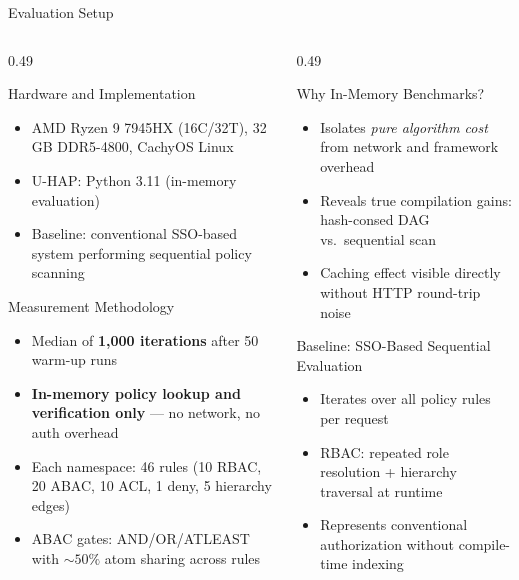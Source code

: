\documentclass[aspectratio=169,10pt]{beamer}
\newcommand{\tightitems}{%
  \setlength{\topsep}{1pt}%
  \setlength{\itemsep}{2pt}%
  \setlength{\parsep}{0pt}%
  \setlength{\parskip}{0pt}%
}
\begin{document}
\begin{frame}[t]{Evaluation Setup}
\vspace{3pt}
\begin{columns}[T,onlytextwidth]
\begin{column}{0.49\textwidth}
\begin{callout}{Hardware and Implementation}
\begin{itemize}\tightitems
\item AMD Ryzen 9 7945HX (16C/32T), 32\,GB DDR5-4800, CachyOS Linux
\item U-HAP: Python 3.11 (in-memory evaluation)
\item Baseline: conventional SSO-based system performing sequential policy scanning
\end{itemize}
\end{callout}
\vspace{3pt}
\begin{callout}{Measurement Methodology}
\begin{itemize}\tightitems
\item Median of \textbf{1,000 iterations} after 50 warm-up runs
\item \textbf{In-memory policy lookup and verification only} --- no network, no auth overhead
\item Each namespace: 46 rules (10 RBAC, 20 ABAC, 10 ACL, 1 deny, 5 hierarchy edges)
\item ABAC gates: AND/OR/ATLEAST with ${\sim}50\%$ atom sharing across rules
\end{itemize}
\end{callout}
\end{column}
\begin{column}{0.49\textwidth}
\begin{callout}{Why In-Memory Benchmarks?}
\begin{itemize}\tightitems
\item Isolates \emph{pure algorithm cost} from network and framework overhead
\item Reveals true compilation gains: hash-consed DAG vs.\ sequential scan
\item Caching effect visible directly without HTTP round-trip noise
\end{itemize}
\end{callout}
\vspace{1pt}
\begin{callout}{Baseline: SSO-Based Sequential Evaluation}
\begin{itemize}\tightitems
\item Iterates over all policy rules per request
\item RBAC: repeated role resolution + hierarchy traversal at runtime
\item Represents conventional authorization without compile-time indexing
\end{itemize}
\end{callout}
\end{column}
\end{columns}
\end{frame}
\end{document}
